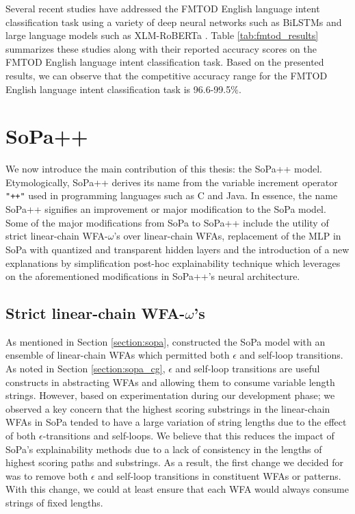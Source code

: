 \label{section:fmtod_performance}

Several recent studies have addressed the FMTOD English language intent
classification task using a variety of deep neural networks such as BiLSTMs and
large language models such as XLM-RoBERTa
\citep{schuster-etal-2019-cross-lingual,zhang2019joint,zhang-etal-2020-intent}.
Table \ref{tab:fmtod_results} summarizes these studies along with their reported
accuracy scores on the FMTOD English language intent classification task. Based
on the presented results, we can observe that the competitive accuracy range for
the FMTOD English language intent classification task is 96.6-99.5$\%$.

\section{SoPa++}

We now introduce the main contribution of this thesis: the SoPa++ model.
Etymologically, SoPa++ derives its name from the variable increment operator
\texttt{"++"} used in programming languages such as C and Java. In essence, the
name SoPa++ signifies an improvement or major modification to the SoPa model.
Some of the major modifications from SoPa to SoPa++ include the utility of
strict linear-chain WFA-$\omega$'s over linear-chain WFAs, replacement of the
MLP in SoPa with quantized and transparent hidden layers and the introduction of
a new explanations by simplification post-hoc explainability technique which
leverages on the aforementioned modifications in SoPa++'s neural architecture.

\subsection{Strict linear-chain WFA-$\omega$'s}

As mentioned in Section \ref{section:sopa}, \citet{schwartz2018sopa} constructed
the SoPa model with an ensemble of linear-chain WFAs which permitted both
$\epsilon$ and self-loop transitions. As noted in Section \ref{section:sopa_cg},
$\epsilon$ and self-loop transitions are useful constructs in abstracting WFAs
and allowing them to consume variable length strings. However, based on
experimentation during our development phase; we observed a key concern that the
highest scoring substrings in the linear-chain WFAs in SoPa tended to have a
large variation of string lengths due to the effect of both
$\epsilon$-transitions and self-loops. We believe that this reduces the impact
of SoPa's explainability methods due to a lack of consistency in the lengths
of highest scoring paths and substrings. As a result, the first change we decided
for was to remove both $\epsilon$ and self-loop transitions in constituent WFAs
or patterns. With this change, we could at least ensure that each WFA would
always consume strings of fixed lengths.

